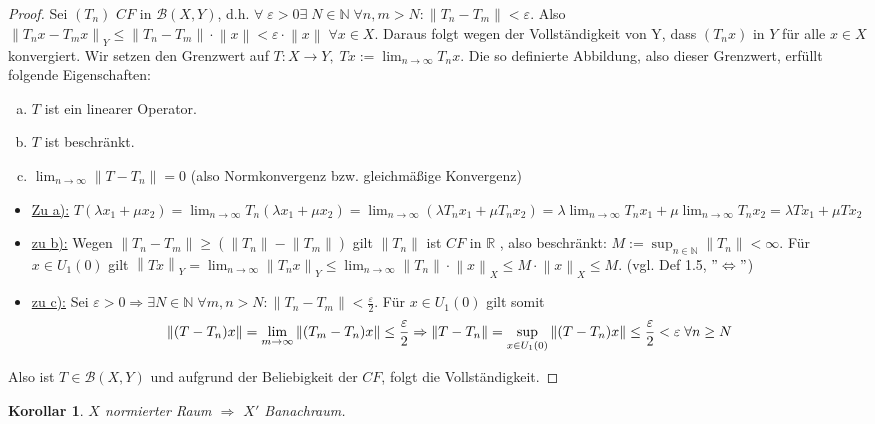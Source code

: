\documentclass[ngerman]{report}
\theoremstyle{plain}%
\newtheorem{cor}[thm]{Korollar}
\theoremstyle{definition}%
\theoremstyle{myStyle}
\newcommand{\R}{\mathbb{R}}
\newcommand{\N}{\mathbb{N}}
\newcommand{\BS}[1][X,Y]{\mathcal{B}(#1)} %
\newcommand{\norm}[1]{\left \|#1\right\| }
\newcommand{\df}[1][]{%
	\overset{#1}{\Rightarrow}
}
\newcommand{\aq}{\Leftrightarrow} %
\newcommand{\U}[2][1]{U_{#1}(#2)} %
\newcommand{\EK}{\U{0}} %
\newcommand{\limes}[1][\infty]{\lim_{n \to #1}}
\newcommand{\supT}[1][a]{
	\IfEqCase{#1}{
	{A}{\sup_{x \in \overline{\EK}}} 
	{R}{\sup_{x \in \partial\EK}}
	{a}{\sup_{x \in \EK}}
	}
} %
\newcommand{\disp}{\displaystyle}
\begin{document}
		\begin{proof}
			Sei $(T_n)$ $CF$ in $\BS$, d.h. 
			$\forall \; \varepsilon > 0 \exists \; N\in \N \; \forall n,m > N: \norm{T_n - T_m} < \varepsilon$.		
			Also $\norm{T_nx - T_mx}_Y \leq \norm{T_n - T_m} \cdot \norm{x} < \varepsilon \cdot \norm{x} \; \forall x\in X$. 
			Daraus folgt wegen der Vollständigkeit von Y, dass $(T_nx)$ in $Y$ für alle $x\in X$ konvergiert.
			Wir setzen den Grenzwert auf $\disp T: X\to Y,\; Tx := \limes T_nx$. Die so definierte Abbildung, also dieser Grenzwert, erfüllt folgende Eigenschaften: 
				\begin{enumerate}[a)]
					\item $T$ ist ein linearer Operator.
					\item $T$ ist beschränkt.
					\item $\disp \limes \norm{T - T_n} = 0$ (also Normkonvergenz bzw. gleichmäßige Konvergenz)
				\end{enumerate}
				\begin{itemize}[]
					\item \underline{Zu a):} 
						$\disp T(\lambda x_1 + \mu x_2) = \limes T_n(\lambda x_1 + \mu x_2) 
						= \limes (\lambda T_n x_1 + \mu T_n x_2) = \lambda \limes T_nx_1 + \mu \limes T_n x_2
						= \lambda T x_1 + \mu T x_2$
					\item \underline{zu b):}
						Wegen $\norm{T_n - T_m} \geq (\norm{T_n} - \norm{T_m})$ gilt $\norm{T_n}$ ist $CF$ in $\R$
						, also beschränkt: $\disp M := \sup_{n\in\N} \norm{T_n} < \infty$. 
						Für $x\in\EK$ gilt $\disp \norm{Tx}_Y = \limes \norm{T_nx}_Y 
						\leq \limes \norm{T_n} \cdot \norm{x}_X \leq M\cdot \norm{x}_X \leq M$. (vgl. Def 1.5, $"\aq"$)
					\item \underline{zu c):}
						Sei $\varepsilon > 0 \df \exists N\in\N \; \forall m,n > N: \norm{T_n - T_m} < \frac{\varepsilon}{2}.$
						Für $x\in \EK$ gilt somit %
						$$\disp \norm{(T-T_n)x} =\lim_{m\to \infty} \norm{(T_m - T_n)x} \leq \frac{\varepsilon}{2}
						\disp \df \norm{T - T_n} = \supT \norm{(T-T_n)x} \leq \frac{\varepsilon}{2} < \varepsilon \; \forall n \geq N$$
						
				\end{itemize}
				Also ist $T\in \BS$ und aufgrund der Beliebigkeit der $CF$, folgt die Vollständigkeit.
		\end{proof}

	\begin{cor}
		$X$ normierter Raum $\df$ $X'$ Banachraum.
	\end{cor}
\end{document}
